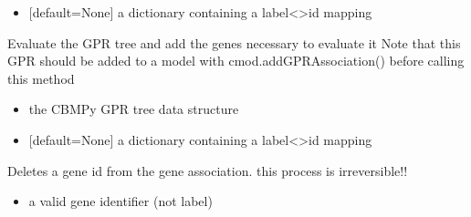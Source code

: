 \documentclass[letterpaper,10pt,english]{sphinxmanual}
\begin{document}
\begin{fulllineitems}
\begin{fulllineitems}
\begin{itemize}
\item {} 
\sphinxAtStartPar
{} {[}default=None{]} a dictionary containing a label\textless{}\textendash{}\textgreater{}id mapping

\end{itemize}

\end{fulllineitems}


\begin{fulllineitems}
\label{\detokenize{modules_doc:cbmpy.CBModel.GeneProteinAssociation.createAssociationAndGeneRefsFromTree}}
\pysigstartsignatures
{}
\pysigstopsignatures
\sphinxAtStartPar
Evaluate the GPR tree and add the genes necessary to evaluate it
Note that this GPR should be added to a model with cmod.addGPRAssociation() before calling this method
\begin{itemize}
\item {} 
\sphinxAtStartPar
{} the CBMPy GPR tree data structure

\item {} 
\sphinxAtStartPar
{} {[}default=None{]} a dictionary containing a label\textless{}\textendash{}\textgreater{}id mapping

\end{itemize}

\end{fulllineitems}


\begin{fulllineitems}
\label{\detokenize{modules_doc:cbmpy.CBModel.GeneProteinAssociation.deleteGeneFromAssociation}}
\pysigstartsignatures
{}
\pysigstopsignatures
\sphinxAtStartPar
Deletes a gene id from the gene association.  this process is irreversible!!
\begin{itemize}
\item {} 
\sphinxAtStartPar
{} a valid gene identifier (not label)


\end{itemize}
\end{fulllineitems}
\end{fulllineitems}
\end{document}
